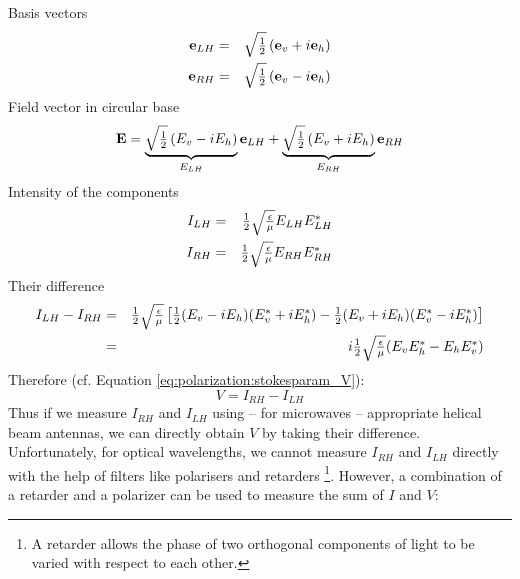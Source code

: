Basis vectors
\begin{eqnarray}
  \label{eq:polarization:e_Lh}
  \mathbf{e}_{LH} &=& \sqrt{\textstyle\frac{1}{2}} \left( \mathbf{e}_v + i\mathbf{e}_h \right) \\
  \label{eq:polarization:e_Rh}
  \mathbf{e}_{RH} &=& \sqrt{\textstyle\frac{1}{2}} \left( \mathbf{e}_v - i\mathbf{e}_h \right) 
\end{eqnarray}
%
Field vector in circular base
\begin{equation}
  \label{eq:polarization:E_circbase}
  \mathbf{E} = \underbrace{
               \sqrt{\textstyle\frac{1}{2}}\left(E_v -  i E_h \right)}_{E_{LH}} 
               \mathbf{e}_{LH} 
              + \underbrace{
               \sqrt{\textstyle\frac{1}{2}}\left(E_v +  i E_h \right)}_{E_{RH}} 
               \mathbf{e}_{RH} 
\end{equation}
%
Intensity of the components
\begin{eqnarray}
  \label{eq:polarization:ILH}
  I_{LH} &=& \textstyle\frac{1}{2}\sqrt{\textstyle{\frac{\epsilon}{\mu}}} E_{LH} E_{LH}^\ast\\
  \label{eq:polarization:IRH}
  I_{RH} &=& \textstyle\frac{1}{2}\sqrt{\textstyle{\frac{\epsilon}{\mu}}} E_{RH} E_{RH}^\ast
\end{eqnarray}
%
Their difference
\begin{eqnarray}
   I_{LH} -  I_{RH}
   &=&
     \textstyle\frac{1}{2}\sqrt{\textstyle{\frac{\epsilon}{\mu}}} \left[
     \textstyle\frac{1}{2} (E_v - i E_h) (E_v^\ast + i E_h^\ast)
    - \textstyle\frac{1}{2} (E_v + i E_h) (E_v^\ast - i E_h^\ast)\right]\\ \nonumber
   &=&
   i \textstyle\frac{1}{2}\sqrt{\textstyle{\frac{\epsilon}{\mu}}} (E_v E_h^\ast -  E_h E_v^\ast)
  \label{eq:polarization:Idiff_circbase}
\end{eqnarray}
Therefore (cf. Equation \ref{eq:polarization:stokesparam_V}):
\begin{equation}
  \label{eq:polarization:V_Idiff}
  V =   I_{RH} -  I_{LH}
\end{equation}
%
Thus if we measure $I_{RH}$ and $I_{LH}$ using -- for microwaves --
appropriate helical beam antennas, we can directly obtain $V$ by
taking their difference.  Unfortunately, for optical wavelengths, we
cannot measure $I_{RH}$ and $I_{LH}$ directly with the help of
filters like  polarisers and retarders%
\footnote{A retarder allows the phase of two orthogonal components 
of light to be varied  with respect to each other.}.  
However, a combination of a retarder and a polarizer can be used
to measure the sum of $I$ and $V$:

